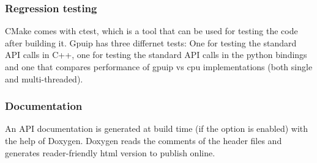 \subsubsection{Regression testing}
CMake comes with ctest, which is a tool that can be used for testing the code after building it. Gpuip has three differnet tests: One for testing the standard API calls in C++, one for testing the standard API calls in the python bindings and one that compares performance of gpuip vs cpu implementations (both single and multi-threaded).

\subsubsection{Documentation}
An API documentation is generated at build time (if the option is enabled) with the help of Doxygen\cite{doxygen}. Doxygen reads the comments of the header files and generates reader-friendly html version to publish online. 
